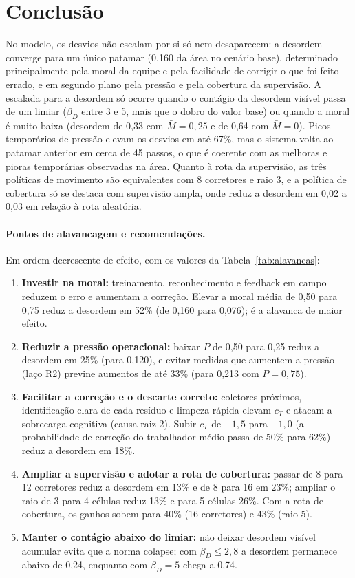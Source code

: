 \documentclass[11pt, a4paper]{article}
\begin{document}
\section{Conclusão}\label{sec:conclusao}
No modelo, os desvios não escalam por si só nem desaparecem: a desordem converge para um único patamar (0,160 da área no cenário base), determinado principalmente pela moral da equipe e pela facilidade de corrigir o que foi feito errado, e em segundo plano pela pressão e pela cobertura da supervisão. A escalada para a desordem só ocorre quando o contágio da desordem visível passa de um limiar ($\beta_D$ entre 3 e 5, mais que o dobro do valor base) ou quando a moral é muito baixa (desordem de 0,33 com $\bar M=0{,}25$ e de 0,64 com $\bar M=0$). Picos temporários de pressão elevam os desvios em até 67\%, mas o sistema volta ao patamar anterior em cerca de 45 passos, o que é coerente com as melhoras e pioras temporárias observadas na área. Quanto à rota da supervisão, as três políticas de movimento são equivalentes com 8 corretores e raio 3, e a política de cobertura só se destaca com supervisão ampla, onde reduz a desordem em 0,02 a 0,03 em relação à rota aleatória.

\paragraph{Pontos de alavancagem e recomendações.}
Em ordem decrescente de efeito, com os valores da Tabela~\ref{tab:alavancas}:
\begin{enumerate}
  \item \textbf{Investir na moral:} treinamento, reconhecimento e feedback em campo reduzem o erro e aumentam a correção. Elevar a moral média de 0,50 para 0,75 reduz a desordem em 52\% (de 0,160 para 0,076); é a alavanca de maior efeito.
  \item \textbf{Reduzir a pressão operacional:} baixar $P$ de 0,50 para 0,25 reduz a desordem em 25\% (para 0,120), e evitar medidas que aumentem a pressão (laço R2) previne aumentos de até 33\% (para 0,213 com $P=0{,}75$).
  \item \textbf{Facilitar a correção e o descarte correto:} coletores próximos, identificação clara de cada resíduo e limpeza rápida elevam $c_T$ e atacam a sobrecarga cognitiva (causa-raiz 2). Subir $c_T$ de $-1{,}5$ para $-1{,}0$ (a probabilidade de correção do trabalhador médio passa de 50\% para 62\%) reduz a desordem em 18\%.
  \item \textbf{Ampliar a supervisão e adotar a rota de cobertura:} passar de 8 para 12 corretores reduz a desordem em 13\% e de 8 para 16 em 23\%; ampliar o raio de 3 para 4 células reduz 13\% e para 5 células 26\%. Com a rota de cobertura, os ganhos sobem para 40\% (16 corretores) e 43\% (raio 5).
  \item \textbf{Manter o contágio abaixo do limiar:} não deixar desordem visível acumular evita que a norma colapse; com $\beta_D\le2{,}8$ a desordem permanece abaixo de 0,24, enquanto com $\beta_D=5$ chega a 0,74.
\end{enumerate}
\end{document}
